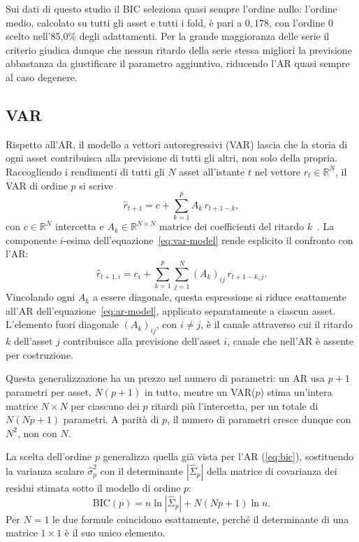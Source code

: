 Sui dati di questo studio il BIC seleziona quasi sempre l'ordine nullo: l'ordine medio, calcolato su tutti gli asset e tutti i fold, è pari a $0{,}178$, con l'ordine $0$ scelto nell'85,0\% degli adattamenti. Per la grande maggioranza delle serie il criterio giudica dunque che nessun ritardo della serie stessa migliori la previsione abbastanza da giustificare il parametro aggiuntivo, riducendo l'AR quasi sempre al caso degenere.

\subsection{VAR}
\label{sec:var-baseline}

Rispetto all'AR, il modello a vettori autoregressivi (VAR) lascia che la storia di ogni asset contribuisca alla previsione di tutti gli altri, non solo della propria. Raccogliendo i rendimenti di tutti gli $N$ asset all'istante $t$ nel vettore $r_t\in\mathbb{R}^N$, il VAR di ordine $p$ si scrive
\begin{equation}
\label{eq:var-model}
\hat r_{t+1} = c + \sum_{k=1}^{p} A_k\, r_{t+1-k},
\end{equation}
con $c\in\mathbb{R}^N$ intercetta e $A_k\in\mathbb{R}^{N\times N}$ matrice dei coefficienti del ritardo $k$~\cite{lutkepohl2005new}. La componente $i$-esima dell'equazione~\eqref{eq:var-model} rende esplicito il confronto con l'AR:
$$\hat r_{t+1,i} = c_i + \sum_{k=1}^{p}\sum_{j=1}^{N} (A_k)_{ij}\, r_{t+1-k,j}.$$
Vincolando ogni $A_k$ a essere diagonale, questa espressione si riduce esattamente all'AR dell'equazione~\eqref{eq:ar-model}, applicato separatamente a ciascun asset. L'elemento fuori diagonale $(A_k)_{ij}$, con $i\ne j$, è il canale attraverso cui il ritardo $k$ dell'asset $j$ contribuisce alla previsione dell'asset $i$, canale che nell'AR è assente per costruzione.

Questa generalizzazione ha un prezzo nel numero di parametri: un AR usa $p+1$ parametri per asset, $N(p+1)$ in tutto, mentre un VAR($p$) stima un'intera matrice $N\times N$ per ciascuno dei $p$ ritardi più l'intercetta, per un totale di $N(Np+1)$ parametri. A parità di $p$, il numero di parametri cresce dunque con $N^2$, non con $N$.

La scelta dell'ordine $p$ generalizza quella già vista per l'AR (\cref{eq:bic}), sostituendo la varianza scalare $\hat\sigma_p^2$ con il determinante $|\hat\Sigma_p|$ della matrice di covarianza dei residui stimata sotto il modello di ordine $p$:
$$\mathrm{BIC}(p) = n\ln\left|\hat\Sigma_p\right| + N(Np+1)\ln n.$$
Per $N=1$ le due formule coincidono esattamente, perché il determinante di una matrice $1\times1$ è il suo unico elemento.

